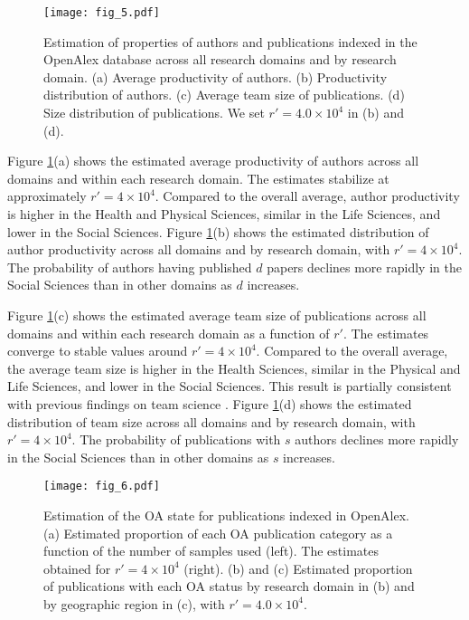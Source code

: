 \begin{figure}[t]
    \centering
    \texttt{[image: fig\_5.pdf]}\\
    \caption{Estimation of properties of authors and publications indexed in the OpenAlex database across all research domains and by research domain. (a) Average productivity of authors. (b) Productivity distribution of authors. (c) Average team size of publications. (d) Size distribution of publications. We set $r' = 4.0 \times 10^4$ in (b) and (d). }
\label{fig:5}
\end{figure}

Figure \ref{fig:5}(a) shows the estimated average productivity of authors across all domains and within each research domain.  
The estimates stabilize at approximately $r' = 4 \times 10^4$.  
Compared to the overall average, author productivity is higher in the Health and Physical Sciences, similar in the Life Sciences, and lower in the Social Sciences.  
Figure \ref{fig:5}(b) shows the estimated distribution of author productivity across all domains and by research domain, with $r' = 4 \times 10^4$.  
The probability of authors having published $d$ papers declines more rapidly in the Social Sciences than in other domains as $d$ increases.

Figure \ref{fig:5}(c) shows the estimated average team size of publications across all domains and within each research domain as a function of $r'$.  
The estimates converge to stable values around $r' = 4 \times 10^4$.  
Compared to the overall average, the average team size is higher in the Health Sciences, similar in the Physical and Life Sciences, and lower in the Social Sciences.  
This result is partially consistent with previous findings on team science \cite{wuchty2007, lariviere2015}.  
Figure \ref{fig:5}(d) shows the estimated distribution of team size across all domains and by research domain, with $r' = 4 \times 10^4$.  
The probability of publications with $s$ authors declines more rapidly in the Social Sciences than in other domains as $s$ increases.

\begin{figure}[p]
    \centering
    \texttt{[image: fig\_6.pdf]}\\
    \caption{Estimation of the OA state for publications indexed in OpenAlex.  
(a) Estimated proportion of each OA publication category as a function of the number of samples used (left). The estimates obtained for $r' = 4 \times 10^4$ (right).  
(b) and (c) Estimated proportion of publications with each OA status by research domain in (b) and by geographic region in (c), with $r' = 4.0 \times 10^4$.}
\label{fig:6}
\end{figure}

